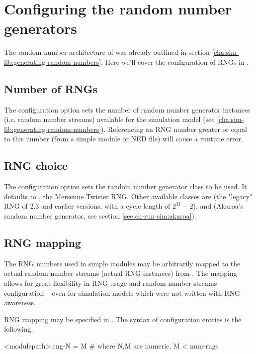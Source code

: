 \section{Configuring the random number generators}
\label{sec:ch-config-sim:rng-config}

The random number architecture of {\opp} was already outlined
in section \ref{cha:sim-lib:generating-random-numbers}. Here
we'll cover the configuration of RNGs in .

\subsection{Number of RNGs}

The  configuration option sets the number of
random number generator instances (i.e. random number streams)
available for the simulation model (see \ref{cha:sim-lib:generating-random-numbers}).
Referencing an RNG number greater or equal to this number
(from a simple module or NED file) will cause a runtime error.


\subsection{RNG choice}

The  configuration option sets the random number
generator class to be used. It defaults to ,
the Mersenne Twister RNG. Other available classes are 
(the "legacy" RNG of {\opp} 2.3 and earlier versions, with a cycle length
of $2^{31}-2$), and  (Akaroa's random number generator,
see section \ref{sec:ch-run-sim:akaroa}).

\subsection{RNG mapping}

The RNG numbers used in simple modules may be arbitrarily mapped to the
actual random number streams (actual RNG instances) from .
The mapping allows for great flexibility in RNG usage and random number
streams configuration -- even for simulation models which were not
written with RNG awareness.

RNG mapping may be specified in . The syntax of
configuration entries is the following.

\begin{inifile}
[General]
<modulepath>.rng-N = M  # where N,M are numeric, M < num-rngs
\end{inifile}

